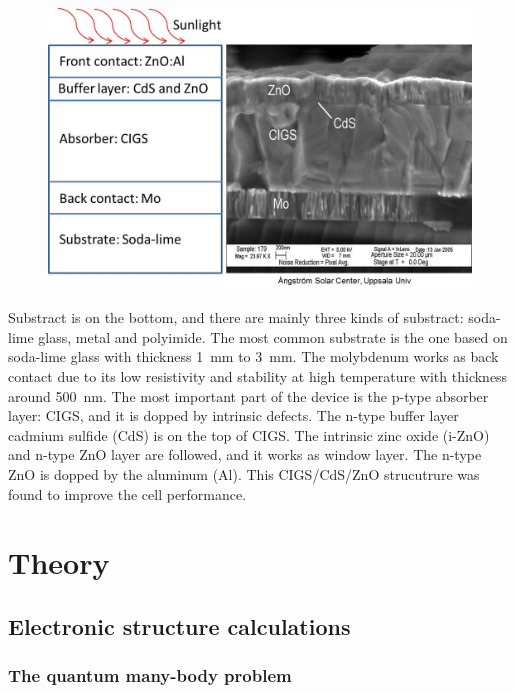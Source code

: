 \documentclass[a4paper, 12pt, titlepage,oneside,drop]{kthesis}
\begin{document}
\begin{figure}[H]
\centering
\includegraphics[scale=0.5]{devicestruc.jpg} 
\caption{}
\label{device}
\end{figure}

Substract is on the bottom, and there are mainly three kinds of substract: soda-lime glass, metal and polyimide. The most common substrate is the one based on soda-lime glass with thickness \SI{1} {\mm} to \SI{3} {\mm}. The molybdenum works as back contact due to its low resistivity and stability at high 
temperature with thickness around \SI{500} {\nm}. The most important part of the device is the p-type absorber layer: CIGS, and it is dopped by intrinsic defects. The n-type buffer layer cadmium sulfide (CdS) is on the top of CIGS.
The intrinsic zinc oxide (i-ZnO) and n-type ZnO layer are followed, and it works as window layer. The n-type ZnO is dopped by the aluminum (Al). This CIGS/CdS/ZnO strucutrure was found to improve the cell performance.







\chapter{Theory}

\section{Electronic structure calculations }
\label{ch:dft}

\subsection{The quantum many-body problem}
\label{ch:mb}
\end{document}
